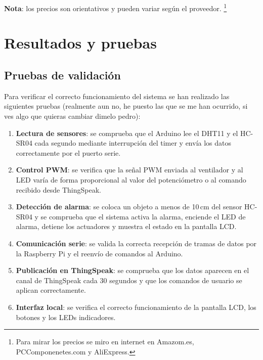 \documentclass[12pt, a4paper]{article}
\begin{document}
\noindent\textbf{Nota}: los precios son orientativos y pueden variar según el proveedor. \footnote{Para mirar los precios se miro en internet en Amazom.es, PCComponenetes.com y AliExpress.}

\newpage

\section{Resultados y pruebas}

\subsection{Pruebas de validación}

Para verificar el correcto funcionamiento del sistema se han realizado las siguientes
pruebas (realmente aun no, he puesto las que se me han ocurrido, si ves algo que quieras cambiar dimelo pedro):

\begin{enumerate}
    \item \textbf{Lectura de sensores}: se comprueba que el Arduino lee el DHT11 y el
          HC-SR04 cada segundo mediante interrupción del timer y envía los datos
          correctamente por el puerto serie.
    \item \textbf{Control PWM}: se verifica que la señal PWM enviada al ventilador y
          al LED varía de forma proporcional al valor del potenciómetro o al comando
          recibido desde ThingSpeak.
    \item \textbf{Detección de alarma}: se coloca un objeto a menos de 10\,cm del
          sensor HC-SR04 y se comprueba que el sistema activa la alarma, enciende el
          LED de alarma, detiene los actuadores y muestra el estado en la pantalla LCD.
    \item \textbf{Comunicación serie}: se valida la correcta recepción de tramas de
          datos por la Raspberry Pi y el reenvío de comandos al Arduino.
    \item \textbf{Publicación en ThingSpeak}: se comprueba que los datos aparecen en
          el canal de ThingSpeak cada 30 segundos y que los comandos de usuario se
          aplican correctamente.
    \item \textbf{Interfaz local}: se verifica el correcto funcionamiento de la
          pantalla LCD, los botones y los LEDs indicadores.
\end{enumerate}
\end{document}

